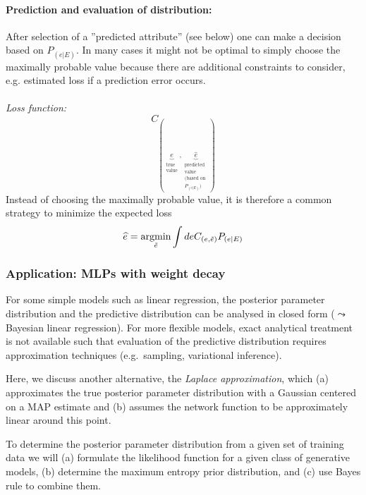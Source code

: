 \paragraph{Prediction and evaluation of distribution:}
After selection of a ''predicted attribute'' (see below) one can make a
decision based on $P_{(e|E)}$. In many cases it might not be
optimal to simply choose the maximally probable value because there are
additional constraints to consider, e.g. estimated loss if a
prediction error occurs. 
\\\\
\emph{Loss function:}
\begin{equation}
	C_{( \underbrace{ e }_{ \substack{	\text{true} \\
						\text{value}} }
		, \underbrace{ \widehat{e} }_{ \substack{
			\text{predicted} \\
			\text{value} \\
			\text{(based on } \\
			P_{(e|E)} \text{)}}} )}
\end{equation}
Instead of choosing the maximally probable value, it is therefore a common strategy to minimize the expected loss
\begin{equation}
	\widehat{e} = \argmin\limits_{\tilde{e}}
		\int d e C_{(e, \tilde{e})} P_{(e|E)}
\end{equation}


\subsubsection{Application: MLPs with weight decay}
For some simple models such as linear regression, the posterior
parameter distribution and the predictive distribution can be analysed
in closed form ($\leadsto$ Bayesian linear regression). For more
flexible models, exact analytical treatment is not available such that
evaluation of the predictive distribution requires approximation
techniques (e.g.\ sampling, variational inference). 

Here, we discuss another alternative, the \emph{Laplace
  approximation}, which (a) approximates the true posterior parameter
distribution with a Gaussian centered on a MAP estimate and (b)
assumes the network function to be approximately linear around this
point.

To determine the posterior parameter distribution from a given set of
training data we will (a) formulate the likelihood function for a
given class of generative models, (b) determine the maximum entropy
prior distribution, and (c) use Bayes rule to combine them.
\\

